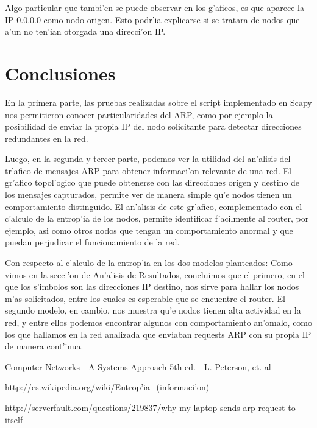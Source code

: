 \documentclass[a4paper,10pt]{article}
\begin{document}
Algo particular que tambi'en se puede observar en los g'aficos, es que aparece la IP 0.0.0.0 como nodo origen. Esto podr'ia explicarse si se tratara de nodos que a'un no ten'ian otorgada una direcci'on IP.

\section{Conclusiones}
\label{conclusion1:}

En la primera parte, las pruebas realizadas sobre el script implementado en Scapy nos permitieron conocer particularidades del ARP, como por ejemplo la posibilidad de enviar la propia IP del nodo solicitante para detectar direcciones redundantes en la red.

Luego, en la segunda y tercer parte, podemos ver la utilidad del an'alisis del tr'afico de mensajes ARP para obtener informaci'on relevante de una red. El gr'afico topol'ogico que puede obtenerse con las direcciones origen y destino de los mensajes capturados, permite ver de manera simple qu'e nodos tienen un comportamiento distinguido. El an'alisis de este gr'afico, complementado con el c'alculo de la entrop'ia de los nodos, permite identificar f'acilmente al router, por ejemplo, asi como otros nodos que tengan un comportamiento anormal y que puedan perjudicar el funcionamiento de la red.

Con respecto al c'alculo de la entrop'ia en los dos modelos planteados: Como vimos en la secci'on de An'alisis de Resultados, concluimos que el primero, en el que los s'imbolos son las direcciones IP destino, nos sirve para hallar los nodos m'as solicitados, entre los cuales es esperable que se encuentre el router. El segundo modelo, en cambio, nos muestra qu'e nodos tienen alta actividad en la red, y entre ellos podemos encontrar algunos con comportamiento an'omalo, como los que hallamos en la red analizada que enviaban requests ARP con su propia IP de manera cont'inua.

\begin{thebibliography}{99}
	\item Computer Networks - A Systems Approach 5th ed. - L. Peterson, et. al
	\item http://es.wikipedia.org/wiki/Entrop'ia\_(informaci'on)
	\item http://serverfault.com/questions/219837/why-my-laptop-sends-arp-request-to-itself 
\end{thebibliography}

\newpage
\end{document}

